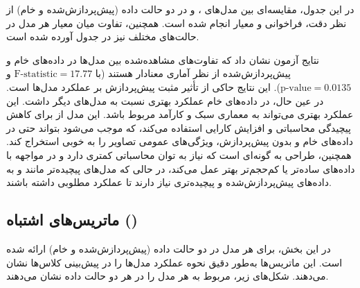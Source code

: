 در این جدول، مقایسه‌ای بین مدل‌های ،  و  در دو حالت داده (پیش‌پردازش‌شده و خام) از نظر دقت، فراخوانی و معیار  انجام شده است. همچنین، تفاوت میان معیار  هر مدل در حالت‌های مختلف نیز در جدول آورده شده است.

نتایج آزمون  نشان داد که تفاوت‌های مشاهده‌شده بین مدل‌ها در داده‌های خام و پیش‌پردازش‌شده از نظر آماری معنادار هستند (با \(\text{F-statistic} = 17.77\) و \(\text{p-value} = 0.0135\)). این نتایج حاکی از تأثیر مثبت پیش‌پردازش بر عملکرد مدل‌ها است. در عین حال،  در داده‌های خام عملکرد بهتری نسبت به مدل‌های دیگر داشت. این عملکرد بهتری می‌تواند به معماری سبک و کارآمد  مربوط باشد. این مدل از  برای کاهش پیچیدگی محاسباتی و افزایش کارایی استفاده می‌کند، که موجب می‌شود بتواند حتی در داده‌های خام و بدون پیش‌پردازش، ویژگی‌های عمومی تصاویر را به خوبی استخراج کند. همچنین، طراحی  به گونه‌ای است که نیاز به توان محاسباتی کمتری دارد و در مواجهه با داده‌های ساده‌تر یا کم‌حجم‌تر بهتر عمل می‌کند، در حالی که مدل‌های پیچیده‌تر مانند  و  به داده‌های پیش‌پردازش‌شده و پیچیده‌تری نیاز دارند تا عملکرد مطلوبی داشته باشند.




\subsection{ماتریس‌های اشتباه ()}

در این بخش،  برای هر مدل در دو حالت داده (پیش‌پردازش‌شده و خام) ارائه شده است. این ماتریس‌ها به‌طور دقیق نحوه عملکرد مدل‌ها را در پیش‌بینی کلاس‌ها نشان می‌دهند. شکل‌های زیر،  مربوط به هر مدل را در هر دو حالت داده نشان می‌دهند.

